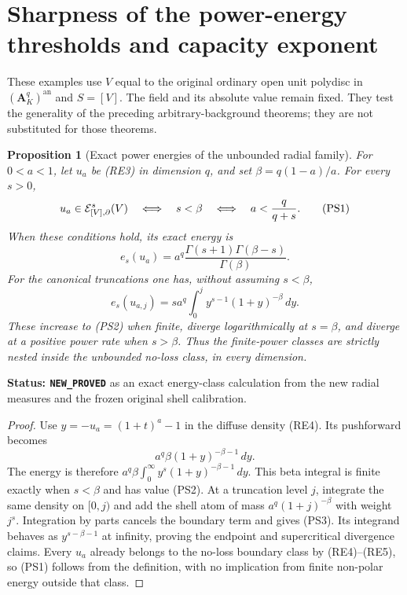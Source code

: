 \documentclass[11pt,a4paper]{article}
\numberwithin{equation}{section}
\newtheorem{proposition}[theorem]{Proposition}
\theoremstyle{definition}
\theoremstyle{remark}
\begin{document}


\section{Sharpness of the power-energy thresholds and capacity exponent}
\label{sec:r11-power-energy-sharpness}

These examples use $V$ equal to the original ordinary open unit
polydisc in $(\mathbf A_K^q)^{\mathrm{an}}$ and $S=[V]$.
The field and its absolute value remain fixed. They test the
generality of the preceding arbitrary-background theorems;
they are not substituted for those theorems.

\begin{proposition}[Exact power energies of the unbounded radial family]
\label{prop:r11-exact-radial-power-energy}
For $0<a<1$, let $u_a$ be (RE3) in dimension $q$, and set
$\beta=q(1-a)/a$. For every $s>0$,
\[
 u_a\in\mathcal E^s_{[V],\partial}(V)
       \quad\Longleftrightarrow\quad
                 s<\beta
       \quad\Longleftrightarrow\quad a<{q\over q+s}.
 \tag{PS1}
\]
When these conditions hold, its exact energy is
\[
 e_s(u_a)
      =a^q\frac{\Gamma(s+1)\Gamma(\beta-s)}{\Gamma(\beta)}.
 \tag{PS2}
\]
For the canonical truncations one has, without assuming $s<\beta$,
\[
 e_s(u_{a,j})=s a^q\int_0^j y^{s-1}(1+y)^{-\beta}\,dy.
 \tag{PS3}
\]
These increase to (PS2) when finite, diverge logarithmically at
$s=\beta$, and diverge at a positive power rate when $s>\beta$.
Thus the finite-power classes are strictly nested inside the
unbounded no-loss class, in every dimension.
\end{proposition}

\noindent\textbf{Status: \texttt{NEW\_PROVED}} as an exact
energy-class calculation from the new radial measures and the
frozen original shell calibration.

\begin{proof}
Use $y=-u_a=(1+t)^a-1$ in the diffuse density (RE4).
Its pushforward becomes
\[
                   a^q\beta(1+y)^{-\beta-1}\,dy.
\]
The energy is therefore
$a^q\beta\int_0^\infty y^s(1+y)^{-\beta-1}\,dy$.
This beta integral is finite exactly when $s<\beta$ and has
value (PS2). At a truncation level $j$, integrate the same
density on $[0,j)$ and add the shell atom of mass
$a^q(1+j)^{-\beta}$ with weight $j^s$. Integration by parts
cancels the boundary term and gives (PS3). Its integrand behaves
as $y^{s-\beta-1}$ at infinity, proving the endpoint and
supercritical divergence claims. Every $u_a$ already belongs
to the no-loss boundary class by (RE4)--(RE5), so (PS1) follows
from the definition, with no implication from finite non-polar
energy outside that class.
\end{proof}
\end{document}
